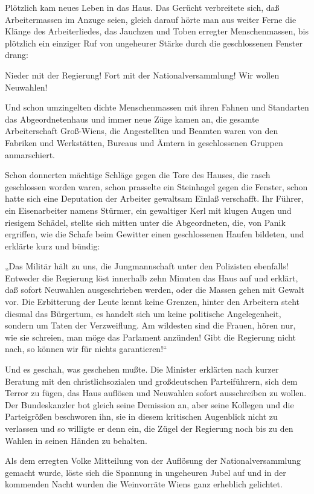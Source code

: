 Plötzlich kam neues Leben in das Haus. Das Gerücht
verbreitete sich, daß Arbeitermassen im Anzuge seien, gleich darauf
hörte man aus weiter Ferne die Klänge des Arbeiterliedes, das
Jauchzen und Toben erregter Menschenmassen, bis plötzlich ein
einziger Ruf von ungeheurer Stärke durch die geschlossenen Fenster
drang:

Nieder mit der Regierung! Fort mit der Nationalversammlung! Wir
wollen Neuwahlen!

Und schon umzingelten dichte Menschenmassen mit ihren Fahnen und
Standarten das Abgeordnetenhaus und immer neue Züge kamen an, die
gesamte Arbeiterschaft Groß-Wiens, die Angestellten und Beamten
waren von den Fabriken und Werkstätten, Bureaus und Ämtern in
geschlossenen Gruppen anmarschiert.

Schon donnerten mächtige Schläge gegen die Tore des Hauses, die
rasch geschlossen worden waren, schon prasselte ein Steinhagel
gegen die Fenster, schon hatte sich eine Deputation der Arbeiter
gewaltsam Einlaß verschafft. Ihr Führer, ein Eisenarbeiter namens
Stürmer, ein gewaltiger Kerl mit klugen Augen und riesigem Schädel,
stellte sich mitten unter die Abgeordneten, die, von Panik
ergriffen, wie die Schafe beim Gewitter einen geschlossenen Haufen
bildeten, und erklärte kurz und bündig:

„Das Militär hält zu uns, die Jungmannschaft unter den Polizisten
ebenfalls! Entweder die Regierung löst innerhalb zehn Minuten das
Haus auf und erklärt, daß sofort Neuwahlen ausgeschrieben werden,
oder die Massen gehen mit Gewalt vor. Die Erbitterung der Leute
kennt  keine Grenzen, hinter den Arbeitern steht
diesmal das Bürgertum, es handelt sich um keine politische
Angelegenheit, sondern um Taten der Verzweiflung. Am wildesten sind
die Frauen, hören  nur, wie sie schreien, man
möge das Parlament anzünden! Gibt die Regierung nicht nach, so
können wir für nichts garantieren!“

Und es geschah, was geschehen mußte. Die Minister erklärten nach
kurzer Beratung mit den christlichsozialen und großdeutschen
Parteiführern, sich dem Terror zu fügen, das Haus auflösen und
Neuwahlen sofort ausschreiben zu wollen. Der Bundeskanzler bot
gleich seine Demission an, aber seine Kollegen und die Parteigrößen
beschworen ihn, sie in diesem kritischen Augenblick nicht zu
verlassen und so willigte er denn ein, die Zügel der Regierung noch
bis zu den Wahlen in seinen Händen zu behalten.

Als dem erregten Volke Mitteilung von der Auflösung der
Nationalversammlung gemacht wurde, löste sich die Spannung in
ungeheuren Jubel auf und in der kommenden Nacht wurden die
Weinvorräte Wiens ganz erheblich gelichtet.

